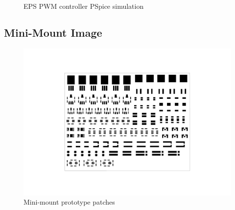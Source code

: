 \begin{appendices}
\begin{figure}
\caption{\ac{EPS} \ac{PWM} controller PSpice simulation}
\label{fig:PSpice_PWM}
\end{figure}
%
\newpage

\subsection{Mini-Mount Image}
\label{app:EPS_mini-mount}
%
\begin{figure}
\centering
\includegraphics[scale=1]{figures/fig_CDR_Mini-mounts}
\caption{Mini-mount prototype patches}
\label{fig:mini-mount}
\end{figure}
%
\end{appendices}